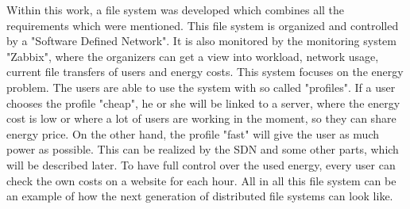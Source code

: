Within this work, a file system was developed which combines all the requirements which were mentioned. This file system is organized and controlled by a "Software Defined Network". It is also monitored by the monitoring system "Zabbix", where the organizers can get a view into workload, network usage, current file transfers of users and energy costs. This system focuses on the energy problem. The users are able to use the system with so called "profiles". If a user chooses the profile "cheap", he or she will be linked to a server, where the energy cost is low or where a lot of users are working in the moment, so they can share energy price. On the other hand, the profile "fast" will give the user as much power as possible. This can be realized by the SDN and some other parts, which will be described later. To have full control over the used energy, every user can check the own costs on a website for each hour. All in all this file system can be an example of how the next generation of distributed file systems can look like.               